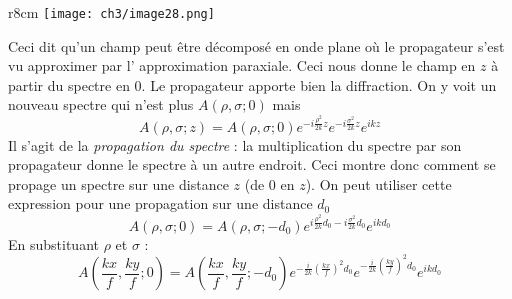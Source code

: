	\begin{wrapfigure}[10]{r}{8cm}
	\vspace{-2mm}
	\texttt{[image: ch3/image28.png]}
	\end{wrapfigure}	
Ceci dit qu'un champ peut être décomposé en onde plane où le propagateur s'est vu approximer par l'
approximation paraxiale. Ceci nous donne le champ en $z$ à partir du spectre en 0. Le propagateur 
apporte bien la diffraction. On y voit un nouveau spectre qui n'est plus $A(\rho,\sigma;0)$ mais
\begin{equation}
A(\rho,\sigma;z) = A(\rho,\sigma;0)e^{-i\frac{\rho^2}{2k}z}e^{-i\frac{\sigma^2}{2k}z} e^{ikz}
\end{equation}
Il s'agit de la \textit{propagation du spectre} : la multiplication du spectre par son propagateur 
donne le spectre à un autre endroit. Ceci montre donc comment se propage un spectre sur une distance 
$z$ (de 0 en $z$).  On peut utiliser cette expression pour une propagation sur une distance $d_0$ 
\begin{equation}
A(\rho,\sigma;0) = A(\rho,\sigma;-d_0)e^{i\frac{\rho^2}{2k}d_0-i\frac{\sigma^2}{2k}d_0} e^{ikd_0}
\end{equation}
En substituant $\rho$ et $\sigma$ :
\begin{equation}
A(\frac{kx}{f},\frac{ky}{f};0) = A(\frac{kx}{f},\frac{ky}{f};-d_0)e^{-\frac{i}{2k}\left(\frac{kx}{f}\right)^2d_0}e^{-
\frac{i}{2k}\left(\frac{ky}{f}\right)^2d_0} e^{ikd_0}
\end{equation}

